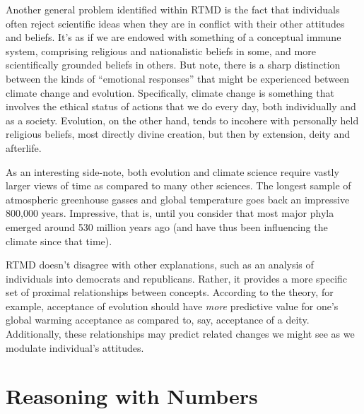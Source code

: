 Another general problem identified within RTMD is the fact that individuals
often reject scientific ideas when they are in conflict with their other
attitudes and beliefs. It's as if we are endowed with something of a conceptual
immune system, %
comprising religious and nationalistic beliefs in some, and more
scientifically grounded beliefs in others.  But note, there is a sharp distinction between
the kinds of ``emotional responses'' that might be experienced between climate
change and evolution. Specifically, climate change is something that
involves the ethical status of actions that we do every day, both individually
and as a society. Evolution, on the other hand, tends to incohere with
personally held religious beliefs, most directly divine creation, but then by
extension, deity and afterlife.

As an interesting side-note, both evolution and climate science require vastly
larger views of time as compared to many other sciences. The longest sample of
atmospheric greenhouse gasses and global temperature goes back an impressive
800,000 years.  Impressive, that is, until you consider that most major phyla
emerged around 530 million years ago (and have thus been influencing the climate
since that time).


RTMD doesn't disagree with other explanations, such as an analysis of
individuals into democrats and republicans. Rather, it provides a more specific
set of proximal relationships between concepts. According to the theory, for
example, acceptance of evolution should have \emph{more} predictive value for
one's global warming acceptance as compared to, say, acceptance of a deity.
Additionally, these relationships may predict related changes we might see as we
modulate individual's attitudes.



\section{Reasoning with Numbers \label{sec:ndi}}


